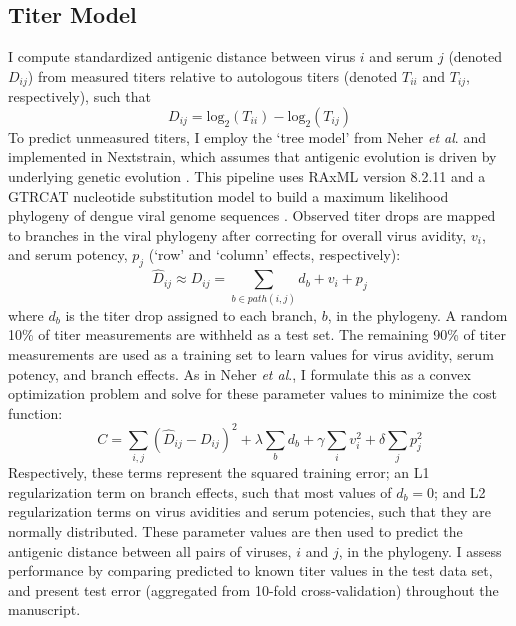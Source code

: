 \subsection*{Titer Model}
I compute standardized antigenic distance between virus $i$ and serum $j$ (denoted $D_{ij}$) from measured titers relative to autologous titers (denoted $T_{ii}$ and $T_{ij}$, respectively), such that
\begin{equation}
  \label{eq_titer_norm}
D_{ij} = \mathrm{log}_2(T_{ii}) - \mathrm{log}_2(T_{ij})
\end{equation}
To predict unmeasured titers, I employ the `tree model' from Neher \textit{et al}. and implemented in Nextstrain, which assumes that antigenic evolution is driven by underlying genetic evolution \citep{hadfield2017nextstrain,neher2016prediction}.
This pipeline uses RAxML version 8.2.11 and a GTRCAT nucleotide substitution model to build a maximum likelihood phylogeny of dengue viral genome sequences \citep{stamatakis2014raxml}.
Observed titer drops are mapped to branches in the viral phylogeny after correcting for overall virus avidity, $v_i$, and serum potency, $p_j$ (`row' and `column' effects, respectively):
\begin{equation}
  \label{eq_predicted_titers}
\hat{D}_{ij} \approx D_{ij} = \sum_{b \in path(i,j)} d_b + v_i + p_j
\end{equation}
where $d_b$ is the titer drop assigned to each branch, $b$, in the phylogeny.
A random 10\% of titer measurements are withheld as a test set.
The remaining 90\% of titer measurements are used as a training set to learn values for virus avidity, serum potency, and branch effects.
As in Neher \textit{et al}., I formulate this as a convex optimization problem and solve for these parameter values to minimize the cost function:
\begin{equation}
  \label{eq_cost_fn}
C = \sum_{i,j} (\hat{D}_{ij} - D_{ij})^2 + \lambda \sum_{b} d_b + \gamma \sum_{i} v_i^2 + \delta \sum_{j} p_j^2
\end{equation}
Respectively, these terms represent the squared training error; an L1 regularization term on branch effects, such that most values of $d_b = 0$; and L2 regularization terms on virus avidities and serum potencies, such that they are normally distributed.
These parameter values are then used to predict the antigenic distance between all pairs of viruses, $i$ and $j$, in the phylogeny.
I assess performance by comparing predicted to known titer values in the test data set, and present test error (aggregated from 10-fold cross-validation) throughout the manuscript.

